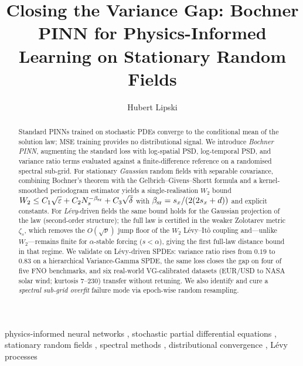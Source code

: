 \documentclass[review,12pt]{elsarticle}
\begin{document}
\begin{frontmatter}

\title{Closing the Variance Gap: Bochner PINN for Physics-Informed Learning on Stationary Random Fields}

\author{Hubert Lipski}
\address{Independent Researcher, Poland}

\begin{abstract}
Standard PINNs trained on stochastic PDEs converge to the conditional
mean of the solution law; MSE training provides no distributional
signal.
We introduce \emph{Bochner PINN}, augmenting the standard loss with
log-spatial PSD, log-temporal PSD, and variance ratio terms evaluated
against a finite-difference reference on a randomised spectral
sub-grid.
For stationary \emph{Gaussian} random fields with separable covariance,
combining Bochner's theorem with the Gelbrich--Givens--Shortt formula
and a kernel-smoothed periodogram estimator yields a single-realisation
$W_2$ bound
\(W_2 \le C_1\sqrt{\varepsilon} + C_2 N_s^{-\beta_{\rm sr}} +
C_3\sqrt{\delta}\) with $\beta_{\rm sr} = s_x/(2(2s_x+d))$
and explicit constants. For \emph{L\'evy}-driven fields the same
bound holds for the Gaussian projection of the law (second-order
structure); the full law is certified in the weaker Zolotarev metric
$\zeta_s$, which removes the $O(\sqrt{\nu})$ jump floor of the
$W_2$ L\'evy--It\^o coupling and---unlike $W_2$---remains finite for
$\alpha$-stable forcing ($s < \alpha$), giving the first full-law
distance bound in that regime.
We validate on L\'evy-driven SPDEs: variance ratio rises from
\(0.19\) to \(0.83\) on a hierarchical Variance-Gamma SPDE, the same
loss closes the gap on four of five FNO benchmarks, and six
real-world VG-calibrated datasets (EUR/USD to NASA solar wind;
kurtosis \(7\)--\(230\)) transfer without retuning.
We also identify and cure a \emph{spectral sub-grid overfit} failure
mode via epoch-wise random resampling.
\end{abstract}

\begin{keyword}
physics-informed neural networks \sep
stochastic partial differential equations \sep
stationary random fields \sep
spectral methods \sep
distributional convergence \sep
L\'evy processes
\end{keyword}

\end{frontmatter}

\tableofcontents
\clearpage

\end{document}
